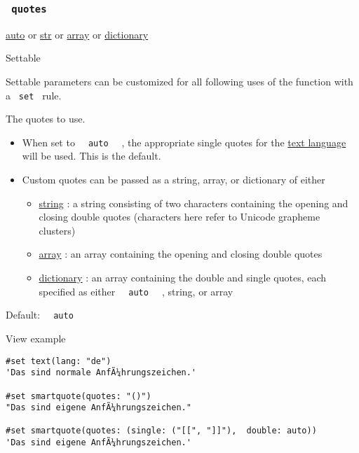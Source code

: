 \subsubsection{\texorpdfstring{\texttt{\ quotes\ }}{ quotes }}\label{parameters-quotes}

\href{/docs/reference/foundations/auto/}{auto} {or}
\href{/docs/reference/foundations/str/}{str} {or}
\href{/docs/reference/foundations/array/}{array} {or}
\href{/docs/reference/foundations/dictionary/}{dictionary}

{{ Settable }}

\label{parameters-quotes-settable-tooltip}
Settable parameters can be customized for all following uses of the
function with a \texttt{\ set\ } rule.

The quotes to use.

\begin{itemize}
\tightlist
\item
  When set to \texttt{\ }{\texttt{\ auto\ }}\texttt{\ } , the
  appropriate single quotes for the
  \href{/docs/reference/text/text/\#parameters-lang}{text language} will
  be used. This is the default.
\item
  Custom quotes can be passed as a string, array, or dictionary of
  either

  \begin{itemize}
  \tightlist
  \item
    \href{/docs/reference/foundations/str/}{string} : a string
    consisting of two characters containing the opening and closing
    double quotes (characters here refer to Unicode grapheme clusters)
  \item
    \href{/docs/reference/foundations/array/}{array} : an array
    containing the opening and closing double quotes
  \item
    \href{/docs/reference/foundations/dictionary/}{dictionary} : an
    array containing the double and single quotes, each specified as
    either \texttt{\ }{\texttt{\ auto\ }}\texttt{\ } , string, or array
  \end{itemize}
\end{itemize}

Default: \texttt{\ }{\texttt{\ auto\ }}\texttt{\ }


View example

\begin{verbatim}
#set text(lang: "de")
'Das sind normale AnfÃ¼hrungszeichen.'

#set smartquote(quotes: "()")
"Das sind eigene AnfÃ¼hrungszeichen."

#set smartquote(quotes: (single: ("[[", "]]"),  double: auto))
'Das sind eigene AnfÃ¼hrungszeichen.'
\end{verbatim}

